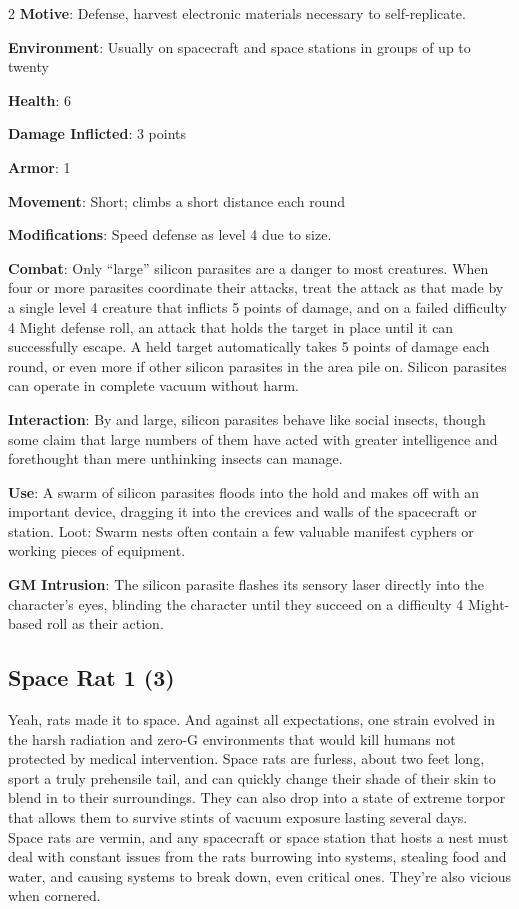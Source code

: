 \begin{multicols}{2}
\textbf{Motive}: Defense, harvest electronic materials necessary to self-replicate. 

\textbf{Environment}: Usually on spacecraft and space stations in groups of up to twenty 

\textbf{Health}: 6 

\textbf{Damage Inflicted}: 3 points 

\textbf{Armor}: 1 

\textbf{Movement}: Short; climbs a short distance each round 

\textbf{Modifications}: Speed defense as level 4 due to size. 

\textbf{Combat}: Only “large” silicon parasites are a danger to most creatures. When four or more parasites coordinate their attacks, treat the attack as that made by a single level 4 creature that inflicts 5 points of damage, and on a failed difficulty 4 Might defense roll, an attack that holds the target in place until it can successfully escape. A held target automatically takes 5 points of damage each round, or even more if other silicon parasites in the area pile on. Silicon parasites can operate in complete vacuum without harm. 

\textbf{Interaction}: By and large, silicon parasites behave like social insects, though some claim that large numbers of them have acted with greater intelligence and forethought than mere unthinking insects can manage. 

\textbf{Use}: A swarm of silicon parasites floods into the hold and makes off with an important device, dragging it into the crevices and walls of the spacecraft or station. Loot: Swarm nests often contain a few valuable manifest cyphers or working pieces of equipment.

\textbf{GM Intrusion}: The silicon parasite flashes its sensory laser directly into the character’s eyes, blinding the character until they succeed on a difficulty 4 Might-based roll as their action.

\subsection{Space Rat 1 (3)}

Yeah, rats made it to space. And against all expectations, one strain evolved in the harsh radiation and zero-G environments that would kill humans not protected by medical intervention. Space rats are furless, about two feet long, sport a truly prehensile tail, and can quickly change their shade of their skin to blend in to their surroundings. They can also drop into a state of extreme torpor that allows them to survive stints of vacuum exposure lasting several days. 
Space rats are vermin, and any spacecraft or space station that hosts a nest must deal with constant issues from the rats burrowing into systems, stealing food and water, and causing systems to break down, even critical ones. They’re also vicious when cornered. 


\end{multicols}
